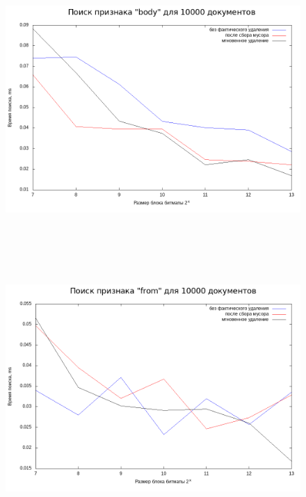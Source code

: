 \begin{figure}[H]
\includegraphics[width=\linewidth, height=10cm]{fig/limit_1/1e4/body_time.png}
\includegraphics[width=\linewidth, height=11cm]{fig/limit_1/1e4/from_time.png}
\end{figure}

